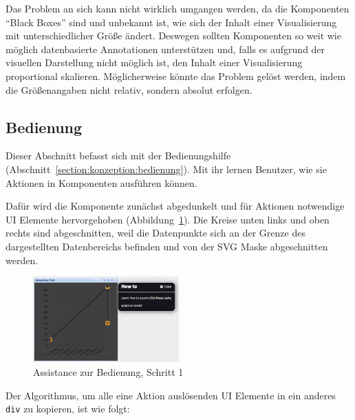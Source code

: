 \documentclass[
	headsepline,
	footsepline,
	fontsize=12pt,
	bibliography=totoc
]{scrbook}
\begin{document}
Das Problem an sich kann nicht wirklich umgangen werden, da die Komponenten \enquote{Black Boxes} sind und unbekannt ist, wie sich der Inhalt einer Visualisierung mit unterschiedlicher Größe ändert. Deswegen sollten Komponenten so weit wie möglich datenbasierte Annotationen unterstützen und, falls es aufgrund der visuellen Darstellung nicht möglich ist, den Inhalt einer Visualisierung proportional skalieren. Möglicherweise könnte das Problem gelöst werden, indem die Größenangaben nicht relativ, sondern absolut erfolgen.

\subsection{Bedienung}
\label{section:implementierung:frontend:bedienung}

Dieser Abschnitt befasst sich mit der Bedienungshilfe (Abschnitt~\ref{section:konzeption:bedienung}). Mit ihr lernen Benutzer, wie sie Aktionen in Komponenten ausführen können.

Dafür wird die Komponente zunächst abgedunkelt und für Aktionen notwendige UI Elemente hervorgehoben (Abbildung~\ref{figure:ui-howto-step1}). Die Kreise unten links und oben rechts sind abgeschnitten, weil die Datenpunkte sich an der Grenze des dargestellten Datenbereichs befinden und von der SVG Maske abgeschnitten werden.

\begin{figure}[htbp]
   \centering
   \includegraphics[width=0.5\textwidth]{images/implementierung-ui-howto-step1.png}
   \caption{Assistance zur Bedienung, Schritt 1}
   \label{figure:ui-howto-step1}
\end{figure}

Der Algorithmus, um alle eine Aktion auslösenden UI Elemente in ein anderes \texttt{div} zu kopieren, ist wie folgt: 
\end{document}
